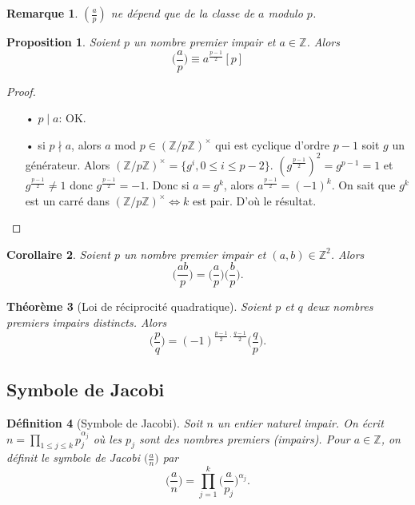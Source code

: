 \documentclass[10pt,a4paper]{report}
\newtheorem{thm}{Théorème}[chapter]
\newtheorem*{rem}{Remarque}
\newtheorem{Def}[thm]{Définition}
\newtheorem{Prop}[thm]{Proposition}
\newtheorem{Cor}[thm]{Corollaire}
\begin{document}
\begin{rem}
$(\tfrac{a}{p})$ ne dépend que de la classe de $a$ modulo $p$.
\end{rem}

\begin{Prop}
Soient $p$ un nombre premier impair et $a \in \mathbb{Z}$. Alors
\begin{equation*}
\Big( \frac{a}{p} \Big) \equiv a^{\tfrac{p-1}{2}}[p]
\end{equation*}
\end{Prop}

\begin{proof}\
\begin{itemize}
\item[•]$p \mid a$: OK.
\item[•] si $p \nmid a$, alors $a$ mod $p \in (\mathbb{Z}/p\mathbb{Z})^{\times}$ qui est cyclique d'ordre $p-1$ soit $g$ un générateur. Alors $(\mathbb{Z}/p\mathbb{Z})^{\times}= \{ g^i, 0 \leqslant i \leqslant p-2 \}$. $(g^{\tfrac{p-1}{2}})^2=g^{p-1}=1$ et $g^{\tfrac{p-1}{2}}\neq 1$ donc $g^{\tfrac{p-1}{2}}=-1$. Donc si $a=g^k$, alors $a^{\tfrac{p-1}{2}}=(-1)^k$. On sait que $g^k$ est un carré dans $(\mathbb{Z}/p\mathbb{Z})^{\times} \Longleftrightarrow k$ est pair. D'où le résultat.
\end{itemize}
\end{proof}

\begin{Cor}
Soient $p$ un nombre premier impair et $(a,b) \in \mathbb{Z}^2$. Alors 
$$  \Big( \frac{ab}{p} \Big)=  \Big( \frac{a}{p} \Big)\Big(  \frac{b}{p}\Big)  .  $$
\end{Cor}

\begin{thm}[Loi de réciprocité quadratique] Soient $p$ et $q$ deux nombres premiers impairs distincts. Alors
$$    \Big(  \frac{p}{q}\Big)=(-1)^{\tfrac{p-1}{2}\cdot \tfrac{q-1}{2}}\Big(  \frac{q}{p}\Big).   $$
\end{thm}


\subsection{Symbole de Jacobi}

\begin{Def}[Symbole de Jacobi]
Soit $n$ un entier naturel impair. On écrit $n=\prod_{1 \leqslant j \leqslant k}p_j^{\alpha_j}$ où les $p_j$ sont des nombres premiers (impairs). Pour $a \in \mathbb{Z}$, on définit le symbole de Jacobi $\big(  \tfrac{a}{n}\big)$ par
$$ \Big(  \frac{a}{n}\Big) =\prod_{j=1}^k \Big(  \frac{a}{p_j}\Big)^{\alpha_j}  .  $$
\end{Def}
\end{document}
